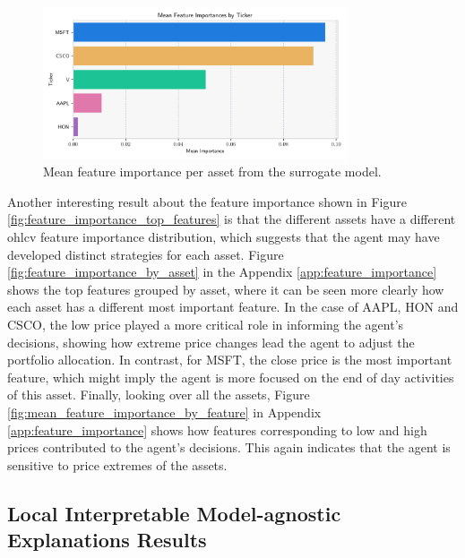 \begin{figure}
    \centering
    \includegraphics[width=0.8\textwidth]{figures/feature_importance_mean_ticker.png}
    \caption{Mean feature importance per asset from the surrogate model.}
    \label{fig:mean_feature_importance_by_asset}
\end{figure}

Another interesting result about the feature importance shown in Figure \ref{fig:feature_importance_top_features} is that the different assets have a different \acrshort{ohlcv} feature importance distribution, which suggests that the agent may have developed distinct strategies for each asset. Figure \ref{fig:feature_importance_by_asset} in the Appendix \ref{app:feature_importance} shows the top features grouped by asset, where it can be seen more clearly how each asset has a different most important feature. In the case of AAPL, HON and CSCO, the low price played a more critical role in informing the agent's decisions, showing how extreme price changes lead the agent to adjust the portfolio allocation. In contrast, for MSFT, the close price is the most important feature, which might imply the agent is more focused on the end of day activities of this asset. Finally, looking over all the assets, Figure \ref{fig:mean_feature_importance_by_feature} in Appendix \ref{app:feature_importance} shows how features corresponding to low and high prices contributed to the agent's decisions. This again indicates that the agent is sensitive to price extremes of the assets.

\subsection{Local Interpretable Model-agnostic Explanations Results} \label{sec:lime-results}

